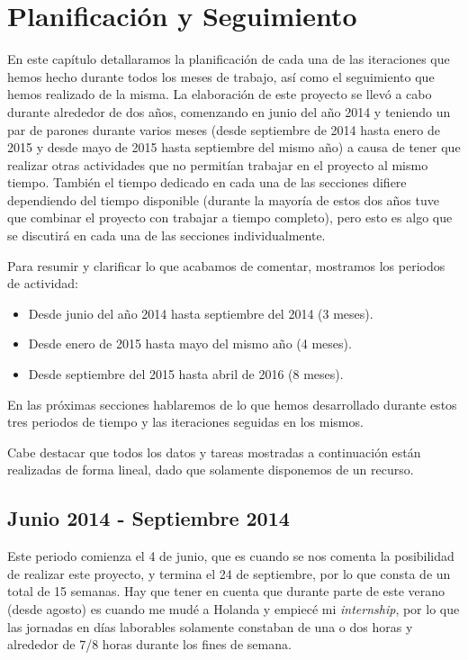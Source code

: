 \chapter{Planificación y Seguimiento}

En este capítulo detallaramos la planificación de cada una de las iteraciones que hemos hecho durante todos los meses de trabajo, así como el seguimiento que hemos realizado de la misma. La elaboración de este proyecto se llevó a cabo durante alrededor de dos años, comenzando en junio del año 2014 y teniendo un par de parones durante varios meses (desde septiembre de 2014 hasta enero de 2015 y desde mayo de 2015 hasta septiembre del mismo año) a causa de tener que realizar otras actividades que no permitían trabajar en el proyecto al mismo tiempo. También el tiempo dedicado en cada una de las secciones difiere dependiendo del tiempo disponible (durante la mayoría de estos dos años tuve que combinar el proyecto con trabajar a tiempo completo), pero esto es algo que se discutirá en cada una de las secciones individualmente.

Para resumir y clarificar lo que acabamos de comentar, mostramos los periodos de actividad:

\begin{itemize}
  \item Desde junio del año 2014 hasta septiembre del 2014 (3 meses).
  \item Desde enero de 2015 hasta mayo del mismo año (4 meses).
  \item Desde septiembre del 2015 hasta abril de 2016 (8 meses).
\end{itemize}

En las próximas secciones hablaremos de lo que hemos desarrollado durante estos tres periodos de tiempo y las iteraciones seguidas en los mismos.

Cabe destacar que todos los datos y tareas mostradas a continuación están realizadas de forma lineal, dado que solamente disponemos de un recurso.

\section{Junio 2014 - Septiembre 2014}

Este periodo comienza el 4 de junio, que es cuando se nos comenta la posibilidad de realizar este proyecto, y termina el 24 de septiembre, por lo que consta de un total de 15 semanas. Hay que tener en cuenta que durante parte de este verano (desde agosto) es cuando me mudé a Holanda y empiecé mi \textit{internship}, por lo que las jornadas en días laborables solamente constaban de una o dos horas y alrededor de 7/8 horas durante los fines de semana.

